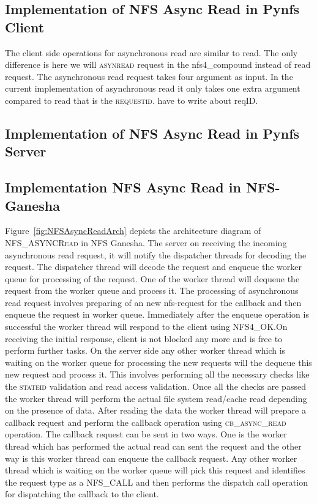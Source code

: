 \subsection{Implementation of NFS Async Read in Pynfs Client}
 
  The client side operations for asynchronous read are similar to read. The only difference is here we will \textsc{asynread} request in the nfs4\_compound instead of read request. The asynchronous read request takes four argument as input. In the current implementation of asynchronous read it only takes one extra argument compared to read that is the \textsc{requestid}. have to write about reqID.
  
\subsection{Implementation of NFS Async Read in Pynfs Server}
  
\subsection{Implementation NFS Async Read in NFS-Ganesha}  

 Figure~\ref{fig:NFSAsyncReadArch} depicts the architecture diagram of \textsc{NFS\_ASYNCRead} in NFS Ganesha. The server on receiving the incoming asynchronous read request, it will notify the dispatcher threads for decoding the request. The dispatcher thread will decode the request and enqueue the worker queue for processing of the request. One of the worker thread will dequeue the request from the worker queue and process it. The processing of asynchronous read request involves preparing of an new nfs-request for the callback and then enqueue the request in worker queue. Immediately after the enqueue operation is successful the worker thread will respond to the client using \textsc{NFS4\_OK}.On receiving the initial response, client is not blocked any more and is free to perform further tasks. On the server side any other worker thread which is waiting on the worker queue for processing the new requests will the dequeue this new request and process it. This involves performing all the necessary checks like the \textsc{stateid} validation and read access validation. Once all the checks are passed the worker thread will perform the actual file system read/cache read depending on the presence of data. After reading the data the worker thread will prepare a callback request and perform the callback operation using \textsc{cb\_async\_read} operation. The callback request can be sent in two ways. One is the worker thread which has performed the actual read can sent the request and the other way is this worker thread can enqueue the callback request. Any other worker thread which is waiting on the worker queue will pick this request and identifies the request type as a \textsc{NFS\_CALL} and then performs the dispatch call operation for dispatching the callback to the client. 
 
